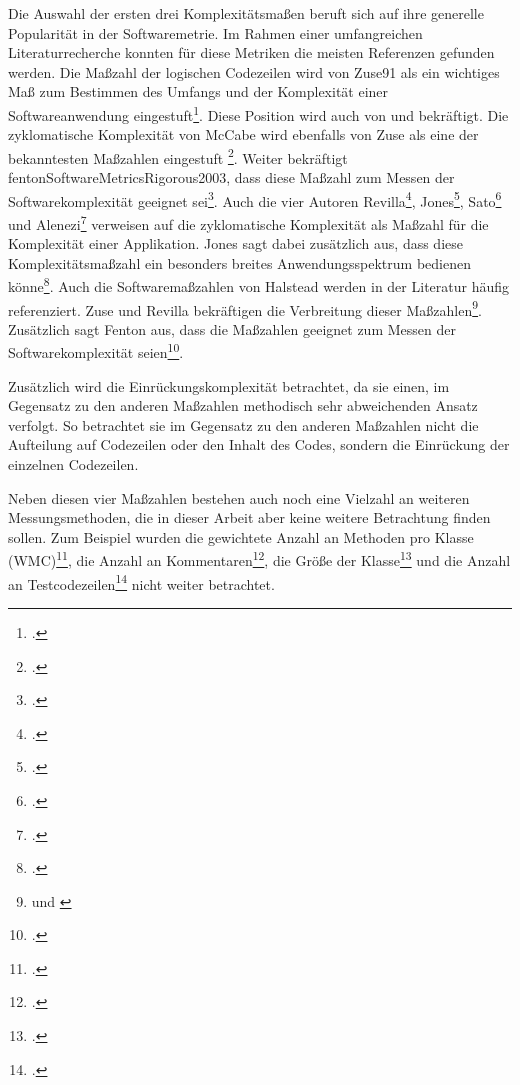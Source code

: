 Die Auswahl der ersten drei Komplexitätsmaßen beruft sich auf ihre
generelle Popularität in der Softwaremetrie. Im Rahmen einer
umfangreichen Literaturrecherche konnten für diese Metriken die meisten
Referenzen gefunden werden. Die Maßzahl der logischen Codezeilen wird
von Zuse91 als ein wichtiges Maß zum Bestimmen des Umfangs und der
Komplexität einer Softwareanwendung eingestuft\footcite[Vgl. ][S. 145]{zuseSoftwareComplexityMeasures1991}.
Diese Position wird auch von \cite{satoExperiencesTrackingAgile2006} und
\cite{aleneziEmpiricalAnalysisComplexity2015} bekräftigt. Die zyklomatische
Komplexität von McCabe wird ebenfalls von Zuse als eine der bekanntesten
Maßzahlen eingestuft \footcite[Vgl. ][S. 145]{zuseSoftwareComplexityMeasures1991}. Weiter bekräftigt
fentonSoftwareMetricsRigorous2003, dass diese Maßzahl zum Messen der
Softwarekomplexität geeignet sei\footcite[Vgl. ][S. 31]{fentonSoftwareMetricsRigorous2003}. Auch die vier Autoren Revilla\footcite[Vgl. ][S. 203]{revillaCorrelationsInternalSoftware2007},
Jones\footcite[Vgl. ][S. 335, 627 und 449]{jonesAppliedSoftwareMeasurement2008}, Sato\footcite[Vgl. ][]{satoExperiencesTrackingAgile2006}
und Alenezi\footcite[Vgl. ][]{aleneziEmpiricalAnalysisComplexity2015} verweisen
auf die zyklomatische Komplexität als Maßzahl für die Komplexität einer
Applikation. Jones sagt dabei zusätzlich aus, dass diese
Komplexitätsmaßzahl ein besonders breites Anwendungsspektrum bedienen
könne\footcite[Vgl. ][S. 335, 627 und 449]{jonesAppliedSoftwareMeasurement2008}. Auch die Softwaremaßzahlen
von Halstead werden in der Literatur häufig referenziert. Zuse und
Revilla bekräftigen die Verbreitung dieser Maßzahlen\footnote{\cite[Vgl. ][S. 145]{zuseSoftwareComplexityMeasures1991} und \cite[S. 203]{revillaCorrelationsInternalSoftware2007}}. Zusätzlich sagt Fenton aus, dass die Maßzahlen
geeignet zum Messen der Softwarekomplexität seien\footcite[Vgl. ][S. 31]{fentonSoftwareMetricsRigorous2003}.

Zusätzlich wird die Einrückungskomplexität betrachtet, da sie einen, im
Gegensatz zu den anderen Maßzahlen methodisch sehr abweichenden Ansatz
verfolgt. So betrachtet sie im Gegensatz zu den
anderen Maßzahlen nicht die Aufteilung auf Codezeilen oder den Inhalt
des Codes, sondern die Einrückung der einzelnen Codezeilen.

Neben diesen vier Maßzahlen bestehen auch noch eine Vielzahl an weiteren
Messungsmethoden, die in dieser Arbeit aber keine weitere Betrachtung
finden sollen. Zum Beispiel wurden die gewichtete Anzahl an Methoden pro
Klasse (WMC)\footcite[Vgl. ][]{satoExperiencesTrackingAgile2006}, die Anzahl an
Kommentaren\footcite[Vgl. ][S. 207]{revillaCorrelationsInternalSoftware2007}, die Größe der Klasse\footcite[Vgl. ][]{satoExperiencesTrackingAgile2006}
und die Anzahl an Testcodezeilen\footcite[Vgl. ][]{satoExperiencesTrackingAgile2006}
nicht weiter betrachtet.

